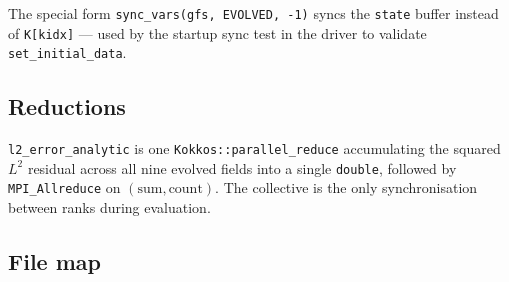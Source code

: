 \documentclass[11pt]{article}
\begin{document}
The special form \texttt{sync\_vars(gfs, EVOLVED, -1)} syncs the
\texttt{state} buffer instead of \texttt{K[kidx]} --- used by the
startup sync test in the driver to validate
\texttt{set\_initial\_data}.

\subsection{Reductions}

\texttt{l2\_error\_analytic} is one
\texttt{Kokkos::parallel\_reduce} accumulating the squared $L^2$
residual across all nine evolved fields into a single
\texttt{double}, followed by \texttt{MPI\_Allreduce} on
$(\text{sum}, \text{count})$.  The collective is the only
synchronisation between ranks during evaluation.

\subsection{File map}
\end{document}
